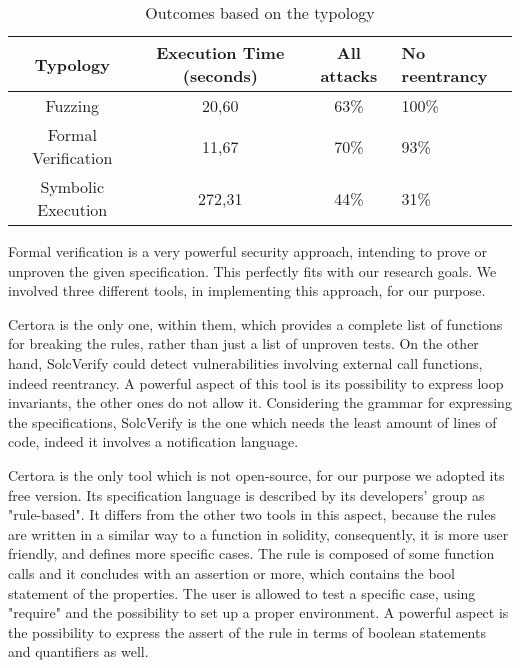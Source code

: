 \begin{center}
    \begin{table*}
        \caption{Outcomes based on the typology}
                \label{tab:Strategies}
                \begin{tabular}{cccl}
                \toprule
                    Typology & Execution Time (seconds) & All attacks & No reentrancy\\
                    \midrule
                    Fuzzing & 20,60 & 63\% & 100\% \\ 
                    Formal Verification  & 11,67 & 70\% & 93\% \\ 
                    Symbolic Execution & 272,31  & 44\% & 31\% \\ 
                \bottomrule
        \end{tabular}
    \end{table*}
    
\end{center}


Formal verification is a very powerful security approach, intending to prove or unproven the given specification. 
This perfectly fits with our research goals.
We involved three different tools, in implementing this approach, for our purpose. 

Certora is the only one, within them, which provides a complete list of functions for breaking the rules, rather than just a list of unproven tests. 
On the other hand, SolcVerify could detect vulnerabilities involving external call functions, indeed reentrancy. A powerful aspect of this tool is its possibility to express 
loop invariants, the other ones do not allow it.
Considering the grammar for expressing the specifications, SolcVerify is the one which needs the least amount of lines of code, indeed it involves a notification language.

Certora is the only tool which is not open-source, for our purpose we adopted its free version.
Its specification language is described by its developers' group as "rule-based". 
It differs from the other two tools in this aspect, because the rules are written in a similar way to a function in solidity, consequently, it is more user friendly, and defines more specific cases.
The rule is composed of some function calls and it concludes with an assertion or more, which contains the bool statement of the properties. 
The user is allowed to test a specific case, 
using "require" and the possibility to set up a proper environment. 
A powerful aspect is the possibility to express the assert of the rule in terms of boolean statements and quantifiers as well.

